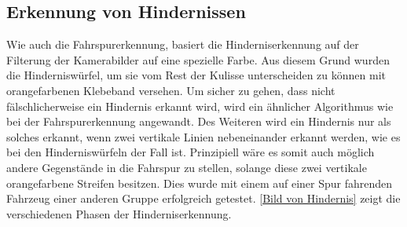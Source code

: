 \subsection{Erkennung von Hindernissen}
\label{sec:hinderniserkennung}
Wie auch die Fahrspurerkennung, basiert die Hinderniserkennung auf der Filterung der Kamerabilder auf eine spezielle Farbe. Aus diesem Grund wurden die Hinderniswürfel, um sie vom Rest der Kulisse unterscheiden zu können mit orangefarbenen Klebeband versehen. Um sicher zu gehen, dass nicht fälschlicherweise ein Hindernis erkannt wird, wird ein ähnlicher Algorithmus wie bei der Fahrspurerkennung angewandt. Des Weiteren wird ein Hindernis nur als solches erkannt, wenn zwei vertikale Linien nebeneinander erkannt werden, wie es bei den Hinderniswürfeln der Fall ist. Prinzipiell wäre es somit auch möglich andere Gegenstände in die Fahrspur zu stellen, solange diese zwei vertikale orangefarbene Streifen besitzen. Dies wurde mit einem auf einer Spur fahrenden Fahrzeug einer anderen Gruppe erfolgreich getestet. \autoref{Bild von Hindernis} zeigt die verschiedenen Phasen der Hinderniserkennung.

